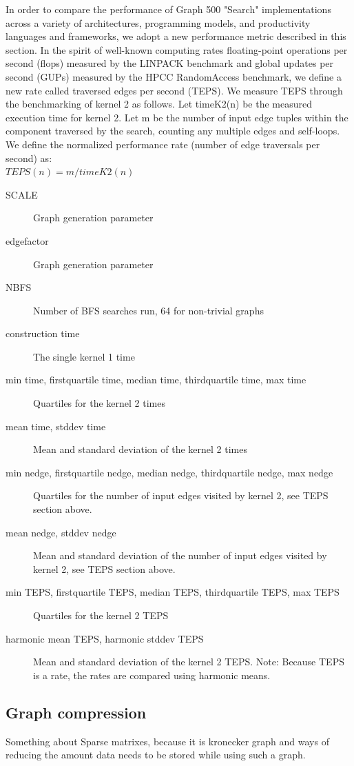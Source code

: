 In order to compare the performance of Graph 500 "Search" implementations across a variety of architectures, programming models, and productivity languages and frameworks, we adopt a new performance metric described in this section. In the spirit of well-known computing rates floating-point operations per second (flops) measured by the LINPACK benchmark and global updates per second (GUPs) measured by the HPCC RandomAccess benchmark, we define a new rate called traversed edges per second (TEPS). We measure TEPS through the benchmarking of kernel 2 as follows. Let timeK2(n) be the measured execution time for kernel 2. Let m be the number of input edge tuples within the component traversed by the search, counting any multiple edges and self-loops. We define the normalized performance rate (number of edge traversals per second) as:
\\
$TEPS(n) = m / timeK2(n)$
\begin{description}
\item[SCALE] Graph generation parameter
\item[edgefactor] Graph generation parameter
\item[NBFS] Number of BFS searches run, 64 for non-trivial graphs
\item[construction time] The single kernel 1 time
\item[min time, firstquartile time, median time, thirdquartile time, max time] Quartiles for the kernel 2 times
\item[mean time, stddev time] Mean and standard deviation of the kernel 2 times
\item[min nedge, firstquartile nedge, median nedge, thirdquartile nedge, max nedge] Quartiles for the number of input edges visited by kernel 2, see TEPS section above.
\item[mean nedge, stddev nedge] Mean and standard deviation of the number of input edges visited by kernel 2, see TEPS section above.
\item[min TEPS, firstquartile TEPS, median TEPS, thirdquartile TEPS, max TEPS]  Quartiles for the kernel 2 TEPS
\item[harmonic mean TEPS, harmonic stddev TEPS] Mean and standard deviation of the kernel 2 TEPS. Note: Because TEPS is a rate, the rates are compared using harmonic means.
\end{description}



\subsection{Graph compression}
\label{back:compression}
Something about Sparse matrixes, because it is kronecker graph and ways of reducing the amount data needs to be stored while using such a graph.


